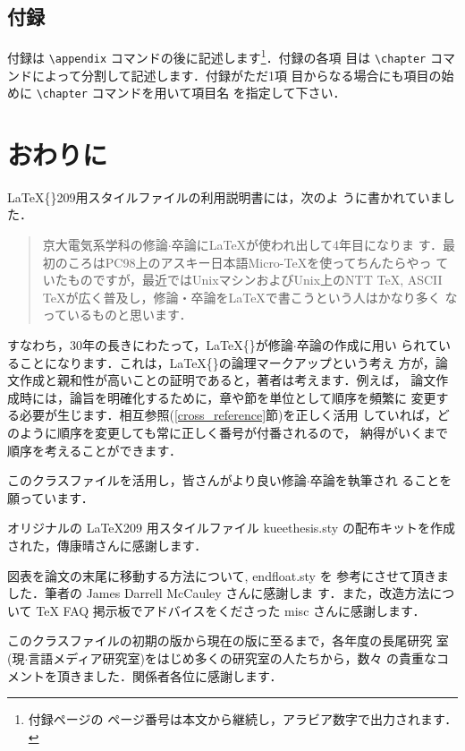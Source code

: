 \documentclass[
  sotsuron]{kuee}
\begin{document}
\hypertarget{ux4ed8ux9332}{%
\section{付録}\label{ux4ed8ux9332}}

付録は \verb+\appendix+ コマンドの後に記述します\footnote{付録ページの
  ページ番号は本文から継続し，アラビア数字で出力されます．}．付録の各項
目は \verb+\chapter+ コマンドによって分割して記述します．付録がただ1項
目からなる場合にも項目の始めに \verb+\chapter+ コマンドを用いて項目名
を指定して下さい．

\hypertarget{ux304aux308fux308aux306b}{%
\chapter{おわりに}\label{ux304aux308fux308aux306b}}

\label{chap:conclusion}

\LaTeX\{\}209用スタイルファイルの利用説明書\cite{OldTebiki}には，次のよ
うに書かれていました．

\begin{quote}
  京大電気系学科の修論$\cdot$卒論に\LaTeX が使われ出して4年目になりま
  す．最初のころはPC98上のアスキー日本語Micro-\TeX を使ってちんたらやっ
  ていたものですが，最近ではUnixマシンおよびUnix上のNTT \TeX, ASCII
  \TeX が広く普及し，修論・卒論を\LaTeX で書こうという人はかなり多く
  なっているものと思います．
\end{quote}

すなわち，30年の長きにわたって，\LaTeX\{\}が修論\(\cdot\)卒論の作成に用い
られていることになります．これは，\LaTeX\{\}の論理マークアップという考え
方が，論文作成と親和性が高いことの証明であると，著者は考えます．例えば，
論文作成時には，論旨を明確化するために，章や節を単位として順序を頻繁に
変更する必要が生じます．相互参照(\ref{cross_reference}節)を正しく活用
していれば，どのように順序を変更しても常に正しく番号が付番されるので，
納得がいくまで順序を考えることができます．

このクラスファイルを活用し，皆さんがより良い修論\(\cdot\)卒論を執筆され
ることを願っています．

\begin{acknowledgements}
  オリジナルの \LaTeX{}209 用スタイルファイル kueethesis.sty の配布キットを作成された，傳康晴さんに感謝します．


  図表を論文の末尾に移動する方法について, endfloat.sty を
  参考にさせて頂きました．筆者の James Darrell McCauley さんに感謝しま
  す．また，改造方法について \TeX{} FAQ 掲示板でアドバイスをくださった
  misc さんに感謝します．

  このクラスファイルの初期の版から現在の版に至るまで，各年度の長尾研究
  室(現$\cdot$言語メディア研究室)をはじめ多くの研究室の人たちから，数々
  の貴重なコメントを頂きました．関係者各位に感謝します．
\end{acknowledgements}
\end{document}
